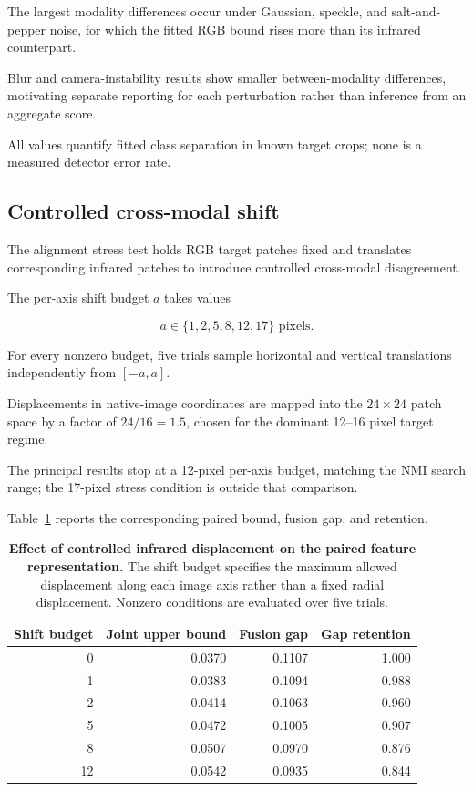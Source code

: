 \documentclass[10pt]{article}
\begin{document}
The largest modality differences occur under Gaussian, speckle, and salt-and-pepper noise, for which the fitted RGB bound rises more than its infrared counterpart.

Blur and camera-instability results show smaller between-modality differences, motivating separate reporting for each perturbation rather than inference from an aggregate score.

All values quantify fitted class separation in known target crops; none is a measured detector error rate.

\subsection{Controlled cross-modal shift}

The alignment stress test holds RGB target patches fixed and translates corresponding infrared patches to introduce controlled cross-modal disagreement.

The per-axis shift budget $a$ takes values

\begin{equation}
a\in\{1,2,5,8,12,17\}\text{ pixels}.
\end{equation}

For every nonzero budget, five trials sample horizontal and vertical translations independently from $[-a,a]$.

Displacements in native-image coordinates are mapped into the $24\times24$ patch space by a factor of $24/16=1.5$, chosen for the dominant 12--16 pixel target regime.

The principal results stop at a 12-pixel per-axis budget, matching the NMI search range; the 17-pixel stress condition is outside that comparison.

Table~\ref{tab:alignsweep} reports the corresponding paired bound, fusion gap, and retention.

\begin{table}[h]
\centering
\caption{\textbf{Effect of controlled infrared displacement on the paired feature representation.}
The shift budget specifies the maximum allowed displacement along each image axis rather than a fixed radial displacement. Nonzero conditions are evaluated over five trials.}
\label{tab:alignsweep}
\small
\begin{tabular}{rrrr}
\toprule
Shift budget
& Joint upper bound
& Fusion gap
& Gap retention \\
\midrule
0  & 0.0370 & 0.1107 & 1.000 \\
1  & 0.0383 & 0.1094 & 0.988 \\
2  & 0.0414 & 0.1063 & 0.960 \\
5  & 0.0472 & 0.1005 & 0.907 \\
8  & 0.0507 & 0.0970 & 0.876 \\
12 & 0.0542 & 0.0935 & 0.844 \\
\bottomrule
\end{tabular}
\end{table}
\end{document}
